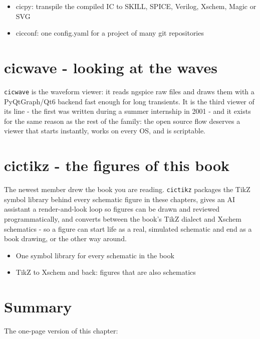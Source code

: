 \begin{itemize}
\tightlist
\item
  cicpy: transpile the compiled IC to SKILL, SPICE, Verilog, Xschem,
  Magic or SVG
\item
  cicconf: one config.yaml for a project of many git repositories
\end{itemize}

\section{cicwave - looking at the
waves}\label{cicwave---looking-at-the-waves}

\texttt{cicwave} is the waveform viewer: it reads ngspice raw files and
draws them with a PyQtGraph/Qt6 backend fast enough for long transients.
It is the third viewer of its line - the first was written during a
summer internship in 2001 - and it exists for the same reason as the
rest of the family: the open source flow deserves a viewer that starts
instantly, works on every OS, and is scriptable.

\section{cictikz - the figures of this
book}\label{cictikz---the-figures-of-this-book}

The newest member drew the book you are reading. \texttt{cictikz}
packages the TikZ symbol library behind every schematic figure in these
chapters, gives an AI assistant a render-and-look loop so figures can be
drawn and reviewed programmatically, and converts between the book's
TikZ dialect and Xschem schematics - so a figure can start life as a
real, simulated schematic and end as a book drawing, or the other way
around.

\begin{itemize}
\tightlist
\item
  One symbol library for every schematic in the book
\item
  TikZ to Xschem and back: figures that are also schematics
\end{itemize}

\section{Summary}\label{summary}

The one-page version of this chapter:

